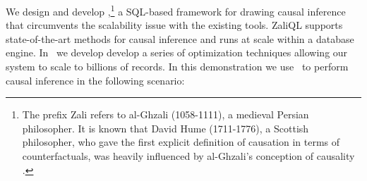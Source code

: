 We design and develop \GSQL,\footnote{ The prefix Zali refers to
  al-Ghzali (1058-1111), a medieval Persian philosopher. It is known
  that David Hume (1711-1776), a Scottish philosopher, who gave the
  first explicit definition of causation in terms of counterfactuals,
  was heavily influenced by al-Ghzali's conception of causality
  \cite{shalizi2013advanced}.}
  a SQL-based framework for drawing causal inference that circumvents the scalability issue with the existing tools.
ZaliQL supports state-of-the-art methods for causal
inference and runs at scale within a database engine.  In \GSQL\ we develop
develop a series of optimization techniques allowing our system to
scale to billions of records. In this demonstration we use \GSQL\ to perform causal inference in the following scenario:

